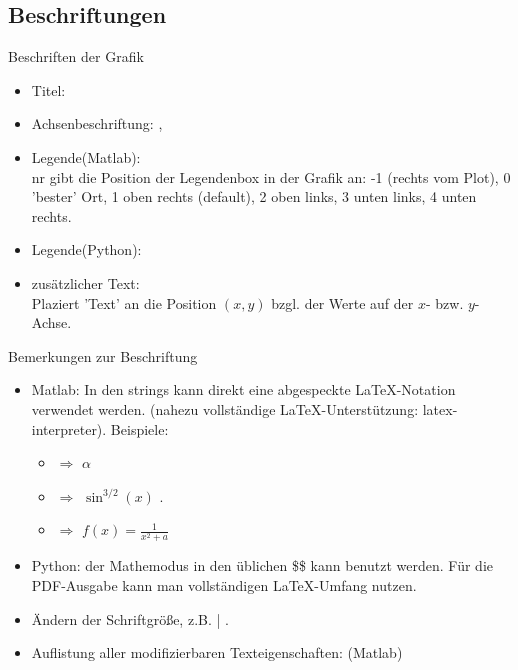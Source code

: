 \documentclass[hyperref={xetex}]{beamer}
\begin{document}
\subsection{Beschriftungen}
% 
% 
\begin{frame}[fragile]{Beschriften der Grafik}
\begin{itemize}
\item Titel:  \alert{ }
\item Achsenbeschriftung:  \alert{ },
  \alert{ } 
\item Legende(Matlab): \alert{ } \\
{\scriptsize \alert{ nr} gibt die Position der Legendenbox in der Grafik an:
  -1 (rechts vom Plot), 0 'bester' Ort, 1 oben rechts (default), 2
  oben links, 3 unten links, 4 unten rechts. }
\item Legende(Python): \alert{}
\item zusätzlicher Text: \alert{ }\\ Plaziert
  'Text' an die Position $(x,y)$ bzgl. der Werte auf der $x$-
  bzw. $y$-Achse. 
\end{itemize}
\end{frame}
% 
% 
\begin{frame}[fragile]{Bemerkungen zur Beschriftung}
\begin{itemize}
  \item  \alert{Matlab:} In den strings kann direkt eine abgespeckte \LaTeX-Notation verwendet werden. (nahezu vollständige 
\LaTeX-Unterstützung: latex-interpreter). 
Beispiele: 
\begin{itemize} \item \imatlab{\\alpha} $\Rightarrow$ $\alpha$
\item {} $\Rightarrow$ $\sin^{3/2}(x)$ .
\item {}
$\Rightarrow$ $f(x) = \frac{1}{x^2+a}$
\end{itemize}
\item \alert{Python:} der Mathemodus in den üblichen \$\$ kann benutzt werden. Für die PDF-Ausgabe kann man vollständigen \LaTeX-Umfang nutzen.
\item Ändern der Schriftgröße, z.B. | .
\item Auflistung aller modifizierbaren Texteigenschaften: (Matlab)
\end{itemize}
\end{frame}
\end{document}
